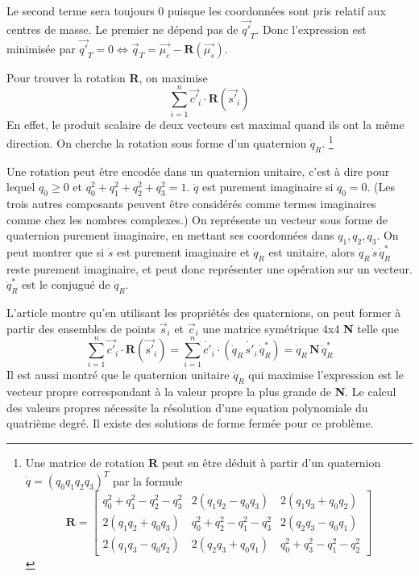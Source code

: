 \documentclass[a4paper,10pt]{scrreprt}
\begin{document}
Le second terme sera toujours $0$ puisque les coordonnées sont pris relatif aux centres de masse. Le premier ne dépend pas de $\vec{q'}_T$. Donc l'expression est minimisée par $\vec{q'}_T = 0 \iff \vec{q}_T = \vec{\mu_c} - \mathbf{R}(\vec{\mu_s})$.

Pour trouver la rotation \textbf{R}, on maximise
\begin{equation}
	\sum_{i=1}^{n} \vec{c'}_{i} \cdot \mathbf{R}(\vec{s'}_i)
\end{equation}
En effet, le produit scalaire de deux vecteurs est maximal quand ils ont la même direction. On cherche la rotation sous forme d'un quaternion $\dot{q}_R$.
\footnote{Une matrice de rotation \textbf{R} peut en être déduit à partir d'un quaternion $\dot{q} = (q_0 q_1 q_2 q_3)^T$ par la formule
\begin{equation}
	\mathbf{R} = \begin{bmatrix}
		q_0^2 + q_1^2 - q_2^2 - q_3^2 & 2(q_1 q_2 - q_0 q_3) & 2(q_1 q_3 + q_0 q_2) \\
		2(q_1 q_2 + q_0 q_3) & q_0^2 + q_2^2 - q_1^2 - q_3^2 & 2(q_2 q_3 - q_0 q_1) \\
		2(q_1 q_3 - q_0 q_2) & 2(q_2 q_3 + q_0 q_1) & q_0^2 + q_3^2 - q_1^2 - q_2^2
	\end{bmatrix}
\end{equation}}

Une rotation peut être encodée dans un quaternion unitaire, c'est à dire pour lequel $q_0 \geq 0$ et $q_0^2 + q_1^2 + q_2^2 + q_3^2 = 1$. $\dot{q}$ est purement imaginaire si $q_0 = 0$. (Les trois autres composants peuvent être considérés comme termes imaginaires comme chez les nombres complexes.) On représente un vecteur sous forme de quaternion purement imaginaire, en mettant ses coordonnées dans $q_1, q_2, q_3$. On peut montrer que si $\dot{s}$ est purement imaginaire et $\dot{q}_R$ est unitaire, alors $\dot{q}_R \, \dot{s} \, \dot{q}^*_R$ reste purement imaginaire, et peut donc représenter une opération sur un vecteur. $\dot{q}^*_R$ est le conjugué de $\dot{q}_R$.

L'article \cite{Horn1986} montre qu'en utilisant les propriétés des quaternions, on peut former à partir des ensembles de points $\vec{s}_i$ et $\vec{c}_i$ une matrice symétrique 4x4 \textbf{N} telle que
\begin{equation}
	\sum_{i=1}^{n} \vec{c'}_{i} \cdot \mathbf{R}(\vec{s'}_i) =
	\sum_{i=1}^{n} \dot{c'}_{i} \cdot (\dot{q}_R \, \dot{s'}_{i} \, \dot{q}^*_R) =
	\dot{q}_R \, \mathbf{N} \, \dot{q}^*_R
\end{equation}
Il est aussi montré que le quaternion unitaire $\dot{q}_R$ qui maximise l'expression est le vecteur propre correspondant à la valeur propre la plus grande de \textbf{N}. Le calcul des valeurs propres nécessite la résolution d'une equation polynomiale du quatrième degré. Il existe des solutions de forme fermée pour ce problème.
\end{document}
